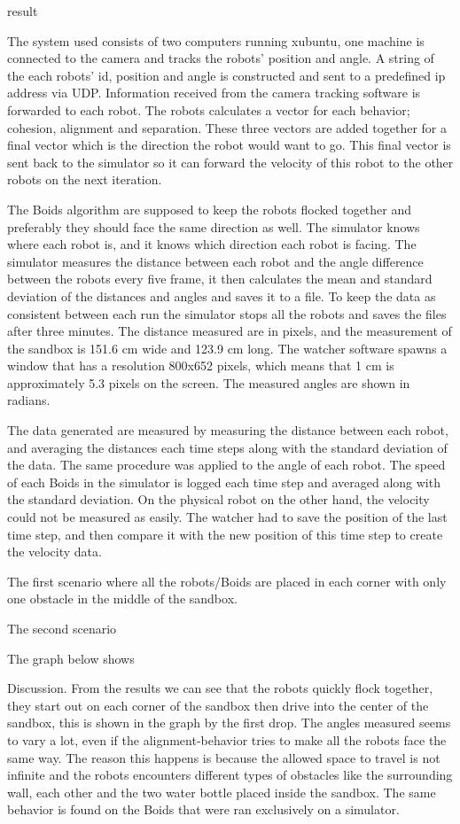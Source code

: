 result

\label{sec:results}
The system used consists of two computers running xubuntu, one machine is connected to the camera and tracks the robots' position and angle. A string of the each robots' id, position and angle is constructed and sent to a predefined ip address via UDP. Information received from the camera tracking software is forwarded to each robot. The robots calculates a vector for each behavior; cohesion, alignment and separation. These three vectors are added together for a final vector which is the direction the robot would want to go. This final vector is sent back to the simulator so it can forward the velocity of this robot to the other robots on the next iteration.

The Boids algorithm are supposed to keep the robots flocked together and preferably they should face the same direction as well. The simulator knows where each robot is, and it knows which direction each robot is facing. The simulator measures the distance between each robot and the angle difference between the robots every five frame, it then calculates the mean and standard deviation of the distances and angles and saves it to a file.
To keep the data as consistent between each run the simulator stops all the robots and saves the files after three minutes.
The distance measured are in pixels, and the measurement of the sandbox is 151.6 cm wide and 123.9 cm long. The watcher software spawns a window that has a resolution 800x652 pixels, which means that 1 cm is approximately 5.3 pixels on the screen. The measured angles are shown in radians.

The data generated are measured by measuring the distance between each robot, and averaging the distances each time steps along with the standard deviation of the data. The same procedure was applied to the angle of each robot.
The speed of each Boids in the simulator is logged each time step and averaged along with the standard deviation. On the physical robot on the other hand, the velocity could not be measured as easily. The watcher had to save the position of the last time step, and then compare it with the new position of this time step to create the velocity data.

The first scenario where all the robots/Boids are placed in each corner with only one obstacle in the middle of the sandbox. 

The second scenario

The graph below shows





Discussion.
From the results we can see that the robots quickly flock together, they start out on each corner of the sandbox then drive into the center of the sandbox, this is shown in the graph by the first drop. 
The angles measured seems to vary a lot, even if the alignment-behavior tries to make all the robots face the same way. The reason this happens is because the allowed space to travel is not infinite and the robots encounters different types of obstacles like the surrounding wall, each other and the two water bottle placed inside the sandbox. The same behavior is found on the Boids that were ran exclusively on a simulator.